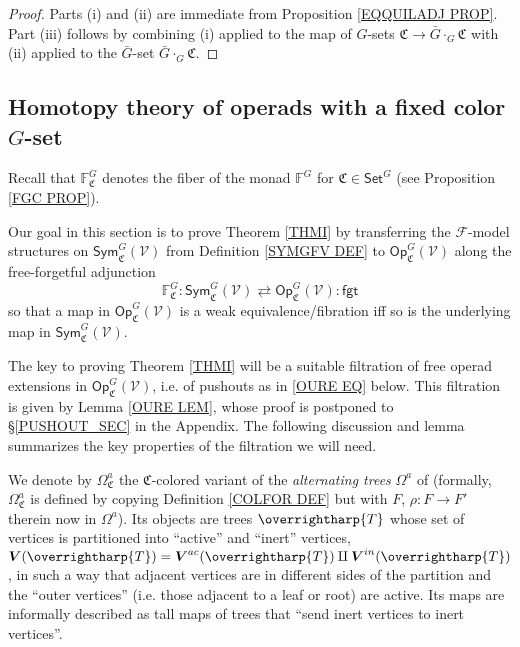 \documentclass[a4paper,10pt
,draft
]{article}%
\numberwithin{equation}{section}
\numberwithin{figure}{section}
\theoremstyle{definition} %
\newcommand{\vect}[1]{\text{\overrightharp{\ensuremath{#1}}}}
\newcommand{\F}{\ensuremath{\mathcal F}}
\newcommand{\V}{\ensuremath{\mathcal V}}
\newcommand{\1}{\ensuremath{\mathbbm 1}}%
\begin{document}
\begin{proof}
	Parts (i) and (ii) are immediate from Proposition \ref{EQQUILADJ PROP}.
	Part (iii) follows by combining (i) applied to 
	the map of $G$-sets $\mathfrak{C} \to \bar{G} \cdot_G \mathfrak{C}$
	with (ii) applied to the $\bar{G}$-set $\bar{G} \cdot_G \mathfrak{C}$.
\end{proof}





\subsection{Homotopy theory of operads with a fixed color $G$-set}
\label{OPC_MS_SEC}


Recall that $\mathbb{F}^G_{\mathfrak{C}}$
denotes the fiber of the monad $\mathbb{F}^G$
for $\mathfrak{C} \in \mathsf{Set}^G$
(see Proposition \ref{FGC PROP}).

Our goal in this section is to prove 
Theorem \ref{THMI} by transferring the $\F$-model structures on
$\mathsf{Sym}^G_{\mathfrak{C}}(\V)$
from Definition \ref{SYMGFV DEF}
to $\mathsf{Op}^G_{\mathfrak{C}}(\V)$
along the free-forgetful adjunction
\begin{equation}\label{OPAUTADJ EQ}
\mathbb{F}^G_{\mathfrak{C}} \colon
\mathsf{Sym}^G_{\mathfrak{C}}(\V)
\rightleftarrows
\mathsf{Op}^G_{\mathfrak{C}}(\V)
\colon \mathsf{fgt}
\end{equation}
so that a map in $\mathsf{Op}^G_{\mathfrak{C}}(\V)$
is a weak equivalence/fibration iff so is the underlying map in 
$\mathsf{Sym}^G_{\mathfrak{C}}(\V)$.
%


The key to proving Theorem \ref{THMI} will be a suitable filtration of free operad extensions in $\mathsf{Op}_{\mathfrak{C}}^G(\V)$,
i.e. of pushouts as in \eqref{OURE EQ} below.
This filtration is given by Lemma \ref{OURE LEM},
whose proof is postponed to \S \ref{PUSHOUT_SEC} in the Appendix.
The following discussion and lemma summarizes the key properties of the filtration we will need.

We denote by $\Omega^a_{\mathfrak{C}}$
the $\mathfrak{C}$-colored variant of the 
\emph{alternating trees} $\Omega^a$ of \cite[Def. 5.52]{BP_geo}
(formally, $\Omega^a_{\mathfrak{C}}$ is defined by copying
Definition \ref{COLFOR DEF} but with 
$F$, $\rho \colon F \to F'$ therein now in $\Omega^a$).
%
Its objects are trees $\vect{T}$ 
whose set of vertices is partitioned into ``active'' and ``inert'' vertices,
$\boldsymbol{V}(\vect T) = 
\boldsymbol{V}^{ac}(\vect T) \amalg \boldsymbol{V}^{in}(\vect T)$,
in such a way that adjacent vertices are in different sides of the partition and the ``outer vertices'' (i.e. those adjacent to a leaf or root) are active.
Its maps are informally described as tall maps of trees that 
``send inert vertices to inert vertices''.
\end{document}
